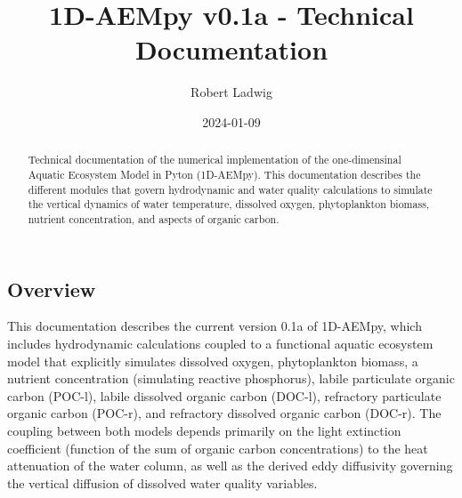 \documentclass[
  letterpaper,
  DIV=11,
  numbers=noendperiod]{scrartcl}
\title{1D-AEMpy v0.1a - Technical Documentation}
\author{Robert Ladwig}
\date{2024-01-09}
\begin{document}
\maketitle
\begin{abstract}
Technical documentation of the numerical implementation of the
one-dimensinal Aquatic Ecosystem Model in Pyton (1D-AEMpy). This
documentation describes the different modules that govern hydrodynamic
and water quality calculations to simulate the vertical dynamics of
water temperature, dissolved oxygen, phytoplankton biomass, nutrient
concentration, and aspects of organic carbon.
\end{abstract}
\ifdefined\Shaded\renewenvironment{Shaded}{\begin{tcolorbox}[breakable, frame hidden, sharp corners, interior hidden, enhanced, borderline west={3pt}{0pt}{shadecolor}, boxrule=0pt]}{\end{tcolorbox}}\fi

\hypertarget{overview}{%
\subsection{Overview}\label{overview}}

This documentation describes the current version 0.1a of 1D-AEMpy, which
includes hydrodynamic calculations coupled to a functional aquatic
ecosystem model that explicitly simulates dissolved oxygen,
phytoplankton biomass, a nutrient concentration (simulating reactive
phosphorus), labile particulate organic carbon (POC-l), labile dissolved
organic carbon (DOC-l), refractory particulate organic carbon (POC-r),
and refractory dissolved organic carbon (DOC-r). The coupling between
both models depends primarily on the light extinction coefficient
(function of the sum of organic carbon concentrations) to the heat
attenuation of the water column, as well as the derived eddy diffusivity
governing the vertical diffusion of dissolved water quality variables.
\end{document}
